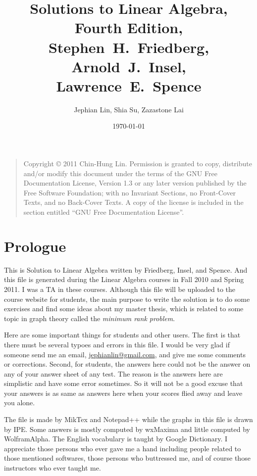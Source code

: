 \documentclass{report}
\title{Solutions to Linear Algebra, Fourth Edition,\\ Stephen~H.~Friedberg, Arnold~J.~Insel, Lawrence~E.~Spence}
\author{Jephian Lin, Shia Su, Zazastone Lai}
\date{\today}
\theoremstyle{definition}
\begin{document}
\maketitle


\begin{quote}
    Copyright \copyright{}  2011  Chin-Hung Lin.
    Permission is granted to copy, distribute and/or modify this document
    under the terms of the GNU Free Documentation License, Version 1.3
    or any later version published by the Free Software Foundation;
    with no Invariant Sections, no Front-Cover Texts, and no Back-Cover Texts.
    A copy of the license is included in the section entitled ``GNU
    Free Documentation License''.
\end{quote}



\chapter*{Prologue}
This is Solution to Linear Algebra written by Friedberg, Insel, and Spence. And this file is generated during the Linear Algebra courses in Fall 2010 and Spring 2011. I was a TA in these courses. Although this file will be uploaded to the course website for students, the main purpose to write the solution is to do some exercises and find some ideas about my master thesis, which is related to some topic in graph theory called the \textit{minimum rank problem}. 

Here are some important things for students and other users. The first is that there must be several typoes and errors in this file. I would be very glad if someone send me an email, \url{jephianlin@gmail.com}, and give me some comments or corrections. Second, for students, the answers here could not be the answer on any of your answer sheet of any test. The reason is the answers here are simplistic and have some error sometimes. So it will not be a good excuse that your answers is as same as answers here when your scores flied away and leave you alone.

The file is made by MikTex and Notepad++ while the graphs in this file is drawn by IPE. Some answers is mostly computed by wxMaxima and little computed by WolframAlpha. The English vocabulary is taught by Google Dictionary. I appreciate those persons who ever gave me a hand including people related to those mentioned softwares, those persons who buttressed me, and of course those instructors who ever taught me. 
\end{document}
